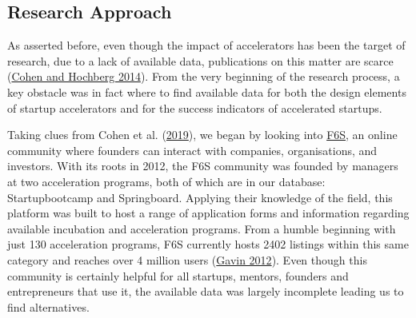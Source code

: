 \documentclass[
  12pt,
]{article}
\begin{document}
\hypertarget{research-approach}{%
\subsection{Research Approach}\label{research-approach}}

As asserted before, even though the impact of accelerators has been the target of research, due to a lack of available data, publications on this matter are scarce (\protect\hyperlink{ref-cohen_accelerating_2014}{Cohen and Hochberg 2014}). From the very beginning of the research process, a key obstacle was in fact where to find available data for both the design elements of startup accelerators and for the success indicators of accelerated startups.

Taking clues from Cohen et al. (\protect\hyperlink{ref-cohen_design_2019}{2019}), we began by looking into \href{https://www.f6s.com/}{F6S}, an online community where founders can interact with companies, organisations, and investors. With its roots in 2012, the F6S community was founded by managers at two acceleration programs, both of which are in our database: Startupbootcamp and Springboard. Applying their knowledge of the field, this platform was built to host a range of application forms and information regarding available incubation and acceleration programs. From a humble beginning with just 130 acceleration programs, F6S currently hosts 2402 listings within this same category and reaches over 4 million users (\protect\hyperlink{ref-f6s_press_2012}{Gavin 2012}). Even though this community is certainly helpful for all startups, mentors, founders and entrepreneurs that use it, the available data was largely incomplete leading us to find alternatives.
\end{document}
